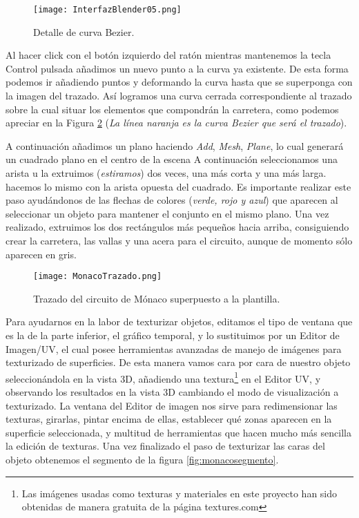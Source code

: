\begin{figure}[h]
	\centering
	\texttt{[image: InterfazBlender05.png]}
	\caption{Detalle de curva Bezier.} \label{fig:interfazblender05}
\end{figure}

Al hacer click con el botón izquierdo del ratón mientras mantenemos la tecla Control pulsada añadimos un nuevo punto a la curva ya existente. De esta forma podemos ir añadiendo puntos y deformando la curva hasta que se superponga con la imagen del trazado. Así logramos una curva cerrada correspondiente al trazado sobre la cual situar los elementos que compondrán la carretera, como podemos apreciar en la Figura \ref{fig:monacotrazado} (\textit{La línea naranja es la curva Bezier que será el trazado}).

A continuación añadimos un plano haciendo \textit{Add}, \textit{Mesh}, \textit{Plane}, lo cual generará un cuadrado plano en el centro de la escena A continuación seleccionamos una arista u la extruimos (\textit{estiramos}) dos veces, una más corta y una más larga. hacemos lo mismo con la arista opuesta del cuadrado. Es importante realizar este paso ayudándonos de las flechas de colores (\textit{verde, rojo y azul}) que aparecen al seleccionar un objeto para mantener el conjunto en el mismo plano. Una vez realizado, extruimos los dos rectángulos más pequeños hacia arriba, consiguiendo crear la carretera, las vallas y una acera para el circuito, aunque de momento sólo aparecen en gris.

\begin{figure}[ht]
	\centering
	\texttt{[image: MonacoTrazado.png]}
	\caption{Trazado del circuito de Mónaco superpuesto a la plantilla.} \label{fig:monacotrazado}
\end{figure}

Para ayudarnos en la labor de texturizar objetos, editamos el tipo de ventana que es la de la parte inferior, el gráfico temporal, y lo sustituimos por un Editor de Imagen/UV, el cual posee herramientas avanzadas de manejo de imágenes para texturizado de superficies. De esta manera vamos cara por cara de nuestro objeto seleccionándola en la vista 3D, añadiendo una textura\footnote{Las imágenes usadas como texturas y materiales en este proyecto han sido obtenidas de manera gratuita de la página textures.com\cite{texturescom}} en el Editor UV, y observando los resultados en la vista 3D cambiando el modo de visualización a texturizado. La ventana del Editor de imagen nos sirve para redimensionar las texturas, girarlas, pintar encima de ellas, establecer qué zonas aparecen en la superficie seleccionada, y multitud de herramientas que hacen mucho más sencilla la edición de texturas. Una vez finalizado el paso de texturizar las caras del objeto obtenemos el segmento de la figura \ref{fig:monacosegmento}.

